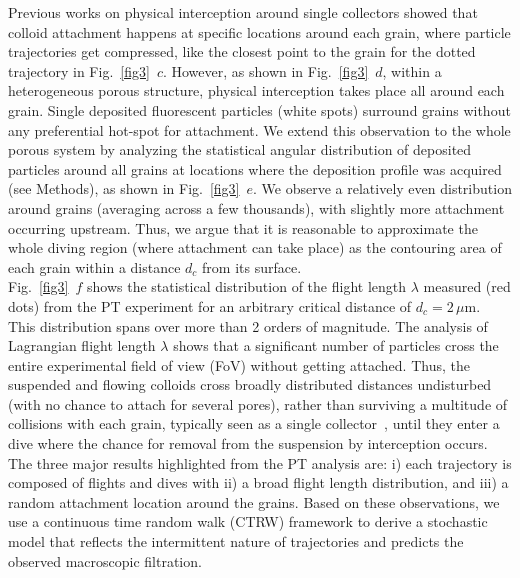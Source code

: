 \documentclass[singlecolumn,pre,notitlepage,preprintnumbers,floatfix,superscriptaddress]{revtex4-1}
\begin{document}
\noindent
Previous works on physical interception around single collectors showed that colloid attachment happens at specific locations around each grain, where particle trajectories get compressed, like the closest point to the grain for the dotted trajectory in Fig.~\ref{fig3}~$c$. However, as shown in Fig.~\ref{fig3}~$d$, within a heterogeneous porous structure, physical interception takes place all around each grain. Single deposited fluorescent particles (white spots) surround grains without any preferential hot-spot for attachment. We extend this observation to the whole porous system by analyzing the statistical angular distribution of deposited particles around all grains at locations where the deposition profile was acquired (see Methods), as shown in Fig.~\ref{fig3}~$e$. We observe a relatively even distribution around grains (averaging across a few thousands), with slightly more attachment occurring upstream. Thus, we argue that it is reasonable to approximate the whole diving region (where attachment can take place) as the contouring area of each grain within a distance $d_c$ from its surface. \\

\noindent
Fig.~\ref{fig3}~$f$ shows the statistical distribution of the flight length $\lambda$ measured (red dots) from the PT experiment for an arbitrary critical distance of $d_c = 2 \, \mu$m. This distribution spans over more than 2 orders of magnitude. The analysis of Lagrangian flight length $\lambda$ shows that a significant number of particles cross the entire experimental field of view (FoV) without getting attached. Thus, the suspended and flowing colloids cross broadly distributed distances undisturbed (with no chance to attach for several pores), rather than surviving a multitude of collisions with each grain, typically seen as a single collector~\cite{YaoEST1971,Johnson2018}, until they enter a dive where the chance for removal from the suspension by interception occurs.\\   

\noindent
The three major results highlighted from the PT analysis are: i) each trajectory is composed of flights and dives with ii) a broad flight length distribution, and iii) a random attachment location around the grains. Based on these observations, we use a continuous time random walk (CTRW) framework to derive a stochastic model that reflects the intermittent nature of trajectories and predicts the observed macroscopic filtration. \\
\end{document}
